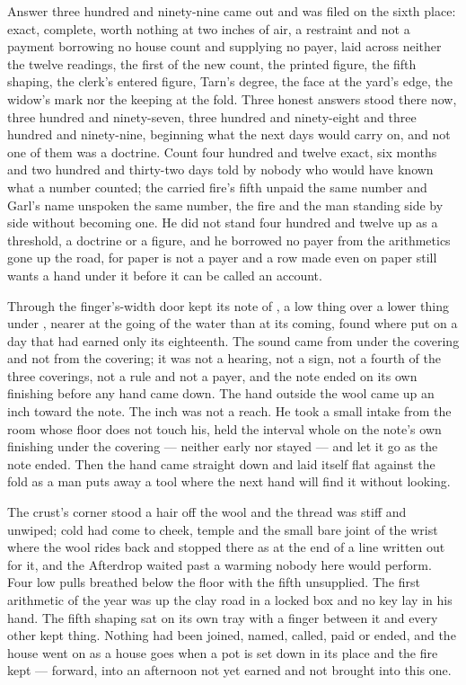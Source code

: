 Answer three hundred and ninety-nine came out and was filed on the sixth place: exact, complete, worth nothing at two inches of air, a restraint and not a payment borrowing no house count and supplying no payer, laid across neither the twelve readings, the first of the new count, the printed figure, the fifth shaping, the clerk's entered figure, Tarn's degree, the face at the yard's edge, the widow's mark nor the keeping at the fold. Three honest answers stood there now, three hundred and ninety-seven, three hundred and ninety-eight and three hundred and ninety-nine, beginning what the next days would carry on, and not one of them was a doctrine. Count four hundred and twelve exact, six months and two hundred and thirty-two days told by nobody who would have known what a number counted; the carried fire's fifth unpaid the same number and Garl's name unspoken the same number, the fire and the man standing side by side without becoming one. He did not stand four hundred and twelve up as a threshold, a doctrine or a figure, and he borrowed no payer from the arithmetics gone up the road, for paper is not a payer and a row made even on paper still wants a hand under it before it can be called an account.

Through the finger's-width door  kept its note of , a low thing over a lower thing under , nearer at the going of the water than at its coming, found where put on a day that had earned only its eighteenth. The sound came from under the covering and not from the covering; it was not a hearing, not a sign, not a fourth of the three coverings, not a rule and not a payer, and the note ended on its own finishing before any hand came down. The hand outside the wool came up an inch toward the note. The inch was not a reach. He took a small intake from the room whose floor does not touch his, held the interval whole on the note's own finishing under the covering --- neither early nor stayed --- and let it go as the note ended. Then the hand came straight down and laid itself flat against the fold as a man puts away a tool where the next hand will find it without looking.

The crust's corner stood a hair off the wool and the thread was stiff and unwiped; cold had come to cheek, temple and the small bare joint of the wrist where the wool rides back and stopped there as at the end of a line written out for it, and the Afterdrop waited past a warming nobody here would perform. Four low pulls breathed below the floor with the fifth unsupplied. The first arithmetic of the year was up the clay road in a locked box and no key lay in his hand. The fifth shaping sat on its own tray with a finger between it and every other kept thing. Nothing had been joined, named, called, paid or ended, and the house went on as a house goes when a pot is set down in its place and the fire kept --- forward, into an afternoon not yet earned and not brought into this one.
